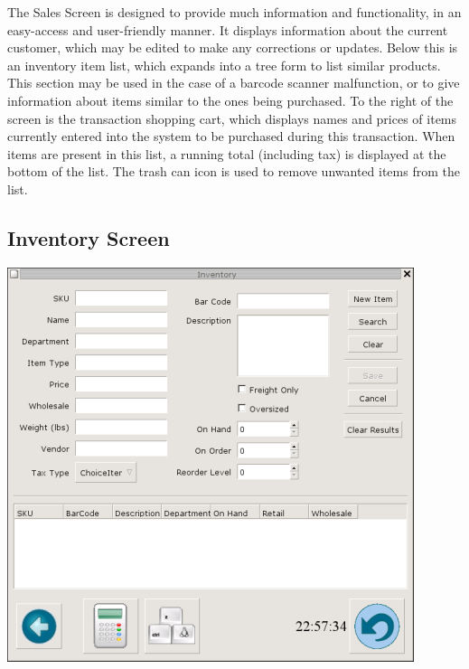 \documentclass{report}
\begin{document}
\begin{itemize}
    The Sales Screen is designed to provide much information and functionality, in
    an easy-access and user-friendly manner.  It displays
    information about the current customer, which may be edited to
    make any corrections or updates.  Below this is an inventory item
    list, which expands into a tree form to list similar
    products.  This section may be used in the case of a barcode
    scanner malfunction, or to give information about items similar
    to the ones being purchased.  To the right of the screen is the
    transaction shopping cart, which displays names and prices of
    items currently entered into the system to be purchased during this
    transaction.  When items are present in this list, a running
    total (including tax) is displayed at the bottom of the list.
    The trash can icon is used to remove unwanted items from the
    list.\\

    \subsection{Inventory Screen}
    \includegraphics{ys_inv_screener.png}\\


\end{itemize}
\end{document}
